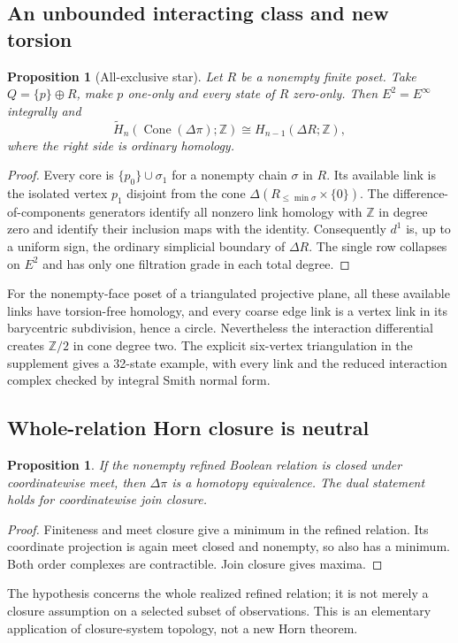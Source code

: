 \documentclass[11pt]{article}
\newtheorem{proposition}[theorem]{Proposition}
\begin{document}
\subsection{An unbounded interacting class and new torsion}
\begin{proposition}[All-exclusive star]
Let $R$ be a nonempty finite poset.  Take $Q=\{p\}\oplus R$, make
$p$ one-only and every state of $R$ zero-only.  Then $E^2=E^\infty$
integrally and
\[
 \widetilde H_n(\operatorname{Cone}(\Delta\pi);\mathbb Z)
 \cong H_{n-1}(\Delta R;\mathbb Z),
\]
where the right side is ordinary homology.
\end{proposition}
\begin{proof}
Every core is $\{p_0\}\cup\sigma_1$ for a nonempty chain $\sigma$
in $R$.  Its available link is the isolated vertex $p_1$ disjoint from
the cone $\Delta(R_{\le\min\sigma}\times\{0\})$.
The difference-of-components generators identify all nonzero link
homology with $\mathbb Z$ in degree zero and identify their inclusion
maps with the identity.  Consequently $d^1$ is, up to a uniform sign,
the ordinary simplicial boundary of $\Delta R$.  The single row
collapses on $E^2$ and has only one filtration grade in each total degree.
\end{proof}

For the nonempty-face poset of a triangulated projective plane, all these
available links have torsion-free homology, and every coarse edge link
is a vertex link in its barycentric subdivision, hence a circle.
Nevertheless the interaction differential creates $\mathbb Z/2$ in
cone degree two.  The explicit six-vertex triangulation in the
supplement gives a 32-state example, with every link and the reduced
interaction complex checked by integral Smith normal form.

\subsection{Whole-relation Horn closure is neutral}
\begin{proposition}
If the nonempty refined Boolean relation is closed under coordinatewise meet,
then $\Delta\pi$ is a homotopy equivalence.  The dual statement holds for
coordinatewise join closure.
\end{proposition}
\begin{proof}
Finiteness and meet closure give a minimum in the refined relation.
Its coordinate projection is again meet closed and nonempty, so also has a
minimum.  Both order complexes are contractible.  Join closure gives maxima.
\end{proof}
The hypothesis concerns the whole realized refined relation; it is not merely
a closure assumption on a selected subset of observations.  This is an
elementary application of closure-system topology, not a new Horn theorem.
\end{document}
